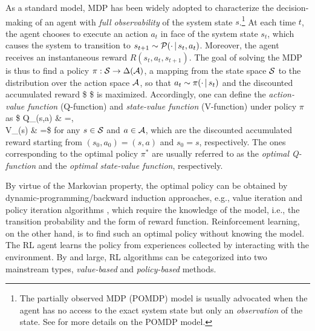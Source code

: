 As a standard model, MDP has been widely adopted to characterize the decision-making of an agent with \emph{full observability} of the system state $s$.\footnote{The partially observed MDP (POMDP) model is usually advocated when the agent has no access to the exact system state but only an \emph{observation} of the state. See {\cite{monahan1982state,cassandra1998exact}} for more details on the POMDP model.}  
At each time $t$, the agent chooses to execute an action $a_t$ in face of the system state $s_t$, which causes the system to transition to $s_{t+1}\sim \mathcal{P}(\cdot{\,|\,} s_t,a_t)$. Moreover, the agent receives an instantaneous  reward $R(s_t,a_t,s_{t+1})$. 
The goal of solving the MDP is thus to find a policy $\pi:{\mathcal{S}}\to\Delta(\mathcal{A})$, a mapping from the state space ${\mathcal{S}}$ to the distribution over the action space $\mathcal{A}$, so that $a_t\sim \pi(\cdot{\,|\,} s_t)$ and the discounted accumulated reward 
\$
\EE{}
\$ is maximized. 
Accordingly, one can define the \emph{action-value function} (Q-function) and \emph{state-value function} (V-function)   under policy $\pi$ as
\$
Q_\pi(s,a) & =\EE\bigg[\sum_{t\geq 0}\gamma^t R(s_t,a_t,s_{t+1})\bigggiven a_t\sim\pi(\cdot\given s_t),a_0=a,s_0=s\bigg], \\
 V_\pi(s) & =\EE\bigg[\sum_{t\geq 0}\gamma^t R(s_t,a_t,s_{t+1})\bigggiven a_t\sim\pi(\cdot\given s_t),s_0=s\bigg]
\$
for any $s\in{\mathcal{S}}$ and $a\in\mathcal{A}$, which are the discounted accumulated reward starting from $(s_0,a_0)=(s,a)$ and $s_0=s$, respectively. The ones corresponding to the optimal policy $\pi^*$ are usually referred to as the \emph{optimal Q-function} and the \emph{optimal state-value  function}, respectively. 

By virtue of the Markovian property, the  optimal policy can be obtained by dynamic-programming/backward induction approaches, e.g., value iteration and policy iteration algorithms \cite{bertsekas2005dynamic}, which require  the knowledge of the model,  i.e., the transition probability and the form of reward function. 
Reinforcement learning, on the other hand,  is to find such an optimal policy without knowing the model. The RL agent learns the policy from experiences collected by interacting with  the environment.  
By and large, RL algorithms can be categorized into two mainstream types, \emph{value-based} and \emph{policy-based} methods. 


